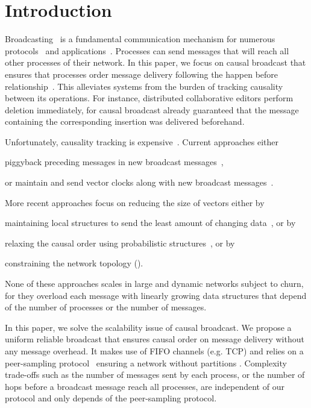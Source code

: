 
\section{Introduction}


Broadcasting~\cite{hadzilacos1994modular} is a fundamental communication
mechanism for numerous
protocols~\cite{nakamoto2009bitcoin,shapiro2011comprehensive} and
applications~\cite{nedelec2016crate}. Processes can send messages that will
reach all other processes of their network. In this paper, we focus on causal
broadcast that ensures that processes order message delivery following the
happen before relationship~\cite{lamport1978time,schwarz1994detecting}. This
alleviates systems from the burden of tracking causality between its
operations. For instance, distributed collaborative editors perform deletion
immediately, for causal broadcast already guaranteed that the message containing
the corresponding insertion was delivered beforehand.

Unfortunately, causality tracking is
expensive~\cite{charronbost1991concerning}. Current approaches either
\begin{inparaenum}[(i)]
\item piggyback preceding messages in new broadcast
  messages~\cite{birman1987reliable,hadzilacos1993fault},
\item or maintain and send vector clocks along with new broadcast
  messages~\cite{fidge1988timestamps,mattern1989virtual}.
\end{inparaenum}
More recent approaches focus on reducing the size of vectors either by
\begin{inparaenum}[(a)]
\item maintaining local structures to send the least amount of changing
  data~\cite{singhal1992efficient}, or by
\item relaxing the causal order using probabilistic
  structures~\cite{mostefaoui2017probabilistic}, or by
\item constraining the network topology (\REF).
\end{inparaenum}
None of these approaches scales in large and dynamic networks subject to churn,
for they overload each message with linearly growing data structures that depend
of the number of processes or the number of messages.

In this paper, we solve the scalability issue of causal broadcast. We propose a
uniform reliable broadcast that ensures causal order on message delivery without
any message overhead.  It makes use of FIFO channels (e.g. TCP) and relies on a
peer-sampling protocol~\cite{jelasity2007gossip} ensuring a network without
partitions .
Complexity trade-offs such as the number of messages sent by each process, or
the number of hops before a broadcast message reach all processes, are
independent of our protocol and only depends of the peer-sampling protocol.

